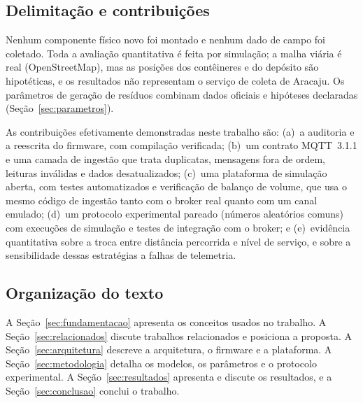 \subsection{Delimitação e contribuições}

Nenhum componente físico novo foi montado e nenhum dado de campo foi coletado.
Toda a avaliação quantitativa é feita por simulação; a malha viária é real
(OpenStreetMap), mas as posições dos contêineres e do depósito são
hipotéticas, e os resultados não representam o serviço de coleta de Aracaju.
Os parâmetros de geração de resíduos combinam dados oficiais e hipóteses
declaradas (Seção~\ref{sec:parametros}).

As contribuições efetivamente demonstradas neste trabalho são:
(a)~a auditoria e a reescrita do firmware, com compilação verificada;
(b)~um contrato MQTT~3.1.1 e uma camada de ingestão que trata duplicatas,
mensagens fora de ordem, leituras inválidas e dados desatualizados;
(c)~uma plataforma de simulação aberta, com testes automatizados e verificação
de balanço de volume, que usa o mesmo código de ingestão tanto com o broker
real quanto com um canal emulado;
(d)~um protocolo experimental pareado (números aleatórios comuns) com
\NExecTotal{} execuções de simulação e testes de integração com o broker; e
(e)~evidência quantitativa sobre a troca entre distância percorrida e nível de
serviço, e sobre a sensibilidade dessas estratégias a falhas de telemetria.

\subsection{Organização do texto}

A Seção~\ref{sec:fundamentacao} apresenta os conceitos usados no trabalho. A
Seção~\ref{sec:relacionados} discute trabalhos relacionados e posiciona a
proposta. A Seção~\ref{sec:arquitetura} descreve a arquitetura, o firmware e a
plataforma. A Seção~\ref{sec:metodologia} detalha os modelos, os parâmetros e o
protocolo experimental. A Seção~\ref{sec:resultados} apresenta e discute os
resultados, e a Seção~\ref{sec:conclusao} conclui o trabalho.
